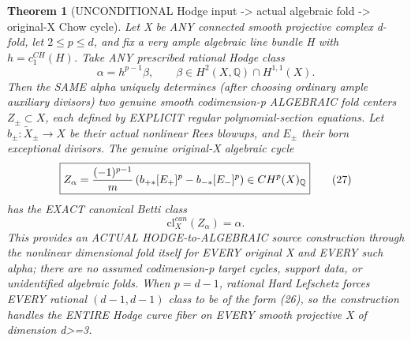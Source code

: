 \documentclass[11pt]{article}
\newtheorem{theorem}{Theorem}[section]
\begin{document}
\begin{theorem}[UNCONDITIONAL Hodge input -> actual algebraic fold -> original-X Chow cycle]
Let X be ANY connected smooth projective
complex d-fold, let $2\le p\le d$, and
fix a very ample algebraic line bundle H with
$h=c_1^{CH}(H)$. Take ANY prescribed rational
Hodge class
\[
 \alpha=h^{p-1}\beta,\qquad
 \beta\in H^2(X,\mathbb Q)\cap H^{1,1}(X).
                                                               \tag{26}
\]
Then the SAME alpha uniquely determines
(after choosing ordinary ample auxiliary
divisors) two genuine smooth codimension-p
ALGEBRAIC fold centers
$Z_\pm\subset X$, each defined by
EXPLICIT regular polynomial-section equations.
Let $b_\pm:\widetilde X_\pm\to X$ be their
actual nonlinear Rees blowups,
and $E_\pm$ their born exceptional divisors.
The genuine original-X algebraic cycle
\[
 \boxed{
 Z_\alpha=
 {(-1)^{p-1}\over m}
 \left(b_{+*}[E_+]^p-b_{-*}[E_-]^p\right)
 \in CH^p(X)_{\mathbb Q}
 }                                                       \tag{27}
\]
has the EXACT canonical Betti class
\[
 \boxed{
 \mathrm{cl}^{can}_X(Z_\alpha)=\alpha .
 }                                                       \tag{28}
\]
This provides an ACTUAL HODGE-to-ALGEBRAIC
source construction through the
nonlinear dimensional fold itself for
EVERY original X and EVERY such alpha;
there are no assumed codimension-p
target cycles, support data,
or unidentified algebraic folds.
When $p=d-1$, rational Hard Lefschetz
forces EVERY rational $(d-1,d-1)$
class to be of the form (26), so
the construction handles the
ENTIRE Hodge curve fiber on EVERY
smooth projective X of dimension d>=3.
\end{theorem}
\end{document}
